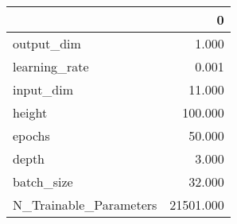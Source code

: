 \begin{tabular}{lr}
\toprule
{} &          0 \\
\midrule
output\_dim             &      1.000 \\
learning\_rate          &      0.001 \\
input\_dim              &     11.000 \\
height                 &    100.000 \\
epochs                 &     50.000 \\
depth                  &      3.000 \\
batch\_size             &     32.000 \\
N\_Trainable\_Parameters &  21501.000 \\
\bottomrule
\end{tabular}
